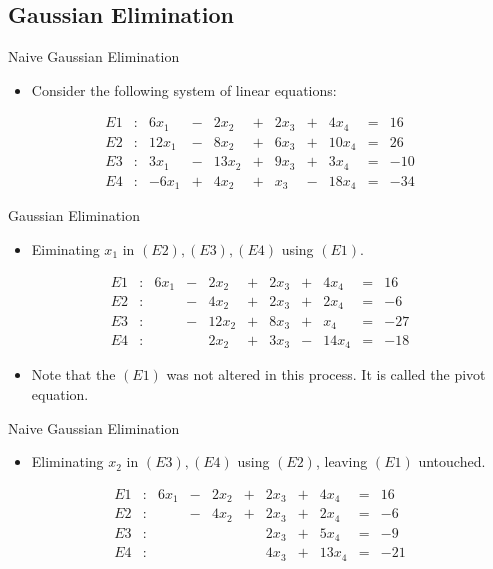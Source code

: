 \documentclass{beamer}
\begin{document}
\subsection[Gaussian Elimination]{Gaussian Elimination}
\begin{frame}{Naive Gaussian Elimination}
\begin{itemize}
\item Consider the following system of linear equations:
\end{itemize}
\begin{block}{}
\begin{align*}
E1&:&6x_1&-&2x_2&+&2 x_3 &+&4 x_4 &=&16\\
E2&:&12x_1&-&8x_2&+&6x_3&+&10x_4 &=&26\\
E3&:&3x_1&-&13x_2&+&9x_3&+&3x_4 &=&-10\\
E4&:&-6x_1&+&4x_2&+&x_3&-&18x_4 &=&-34 
\end{align*}
\end{block}
\end{frame}
\begin{frame}{Gaussian Elimination}
\begin{itemize}
\item Eiminating $x_1$ in $(E2),(E3),(E4)$ using $(E1)$. 
\end{itemize}
\begin{block}{}
\begin{align*}
E1&:&6x_1&-&2x_2&+&2 x_3 &+&4 x_4 &=&16\\
E2&:&&-&4x_2&+&2x_3&+&2x_4 &=&-6\\
E3&:&&-&12x_2&+&8x_3&+&x_4 &=&-27\\
E4&:&&&2x_2&+&3x_3&-&14x_4 &=&-18 
\end{align*}
\end{block}
\begin{itemize}
\item Note that the $(E1)$ was not altered in this process. It is called the \alert{pivot equation}.
\end{itemize}


\end{frame}
\begin{frame}{Naive Gaussian Elimination}
\begin{itemize}
\item Eliminating $x_2$ in $(E3),(E4)$ using $(E2)$, leaving $(E1)$ untouched.
\end{itemize}
\begin{block}{}
\begin{align*}
E1&:&6x_1&-&2x_2&+&2 x_3 &+&4 x_4 &=&16\\
E2&:&&-&4x_2&+&2x_3&+&2x_4 &=&-6\\
E3&:&&&&&2x_3&+&5x_4 &=&-9\\
E4&:&&&&&4x_3&+&13x_4 &=&-21 
\end{align*}
\end{block}

\end{frame}
\end{document}
